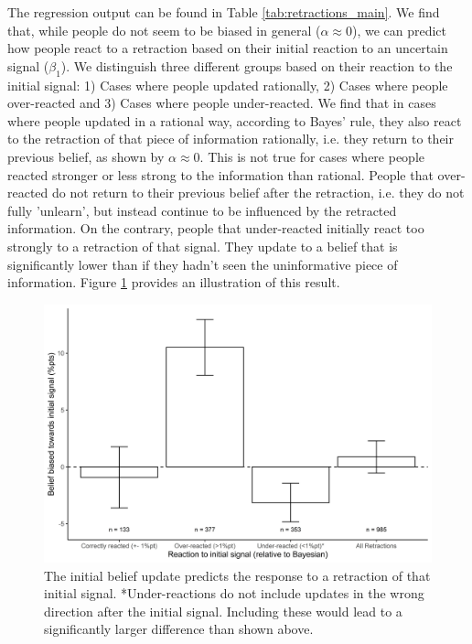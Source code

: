 \documentclass{article}
\begin{document}
The regression output can be found in Table \ref{tab:retractions_main}. We find that, while people do not seem to be biased in general ($\alpha\approx0$), we can predict how people react to a retraction based on their initial reaction to an uncertain signal ($\beta_1$). We distinguish three different groups based on their reaction to the initial signal: 1) Cases where people updated rationally, 2) Cases where people over-reacted and 3) Cases where people under-reacted. We find that in cases where people updated in a rational way, according to Bayes' rule, they also react to the retraction of that piece of information rationally, i.e. they return to their previous belief, as shown by $\alpha\approx 0$. This is not true for cases where people reacted stronger or less strong to the information than rational. People that over-reacted do not return to their previous belief after the retraction, i.e. they do not fully 'unlearn', but instead continue to be influenced by the retracted information. On the contrary, people that under-reacted initially react too strongly to a retraction of that signal. They update to a belief that is significantly lower than if they hadn't seen the uninformative piece of information. Figure \ref{fig:retraction_result_main} provides an illustration of this result.

\begin{figure}[!htb]
    \centering
    \includegraphics[width = 12cm]{Fig/02_fig_retract_diff_group.jpg}
    \caption{The initial belief update predicts the response to a retraction of that initial signal. *Under-reactions do not include updates in the wrong direction after the initial signal. Including these would lead to a significantly larger difference than shown above.}
    \label{fig:retraction_result_main}
\end{figure}
\end{document}
